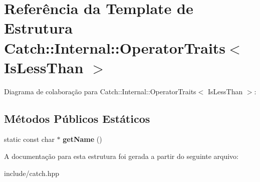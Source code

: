 \hypertarget{structCatch_1_1Internal_1_1OperatorTraits_3_01IsLessThan_01_4}{}\section{Referência da Template de Estrutura Catch\+:\+:Internal\+:\+:Operator\+Traits$<$ Is\+Less\+Than $>$}
\label{structCatch_1_1Internal_1_1OperatorTraits_3_01IsLessThan_01_4}


Diagrama de colaboração para Catch\+:\+:Internal\+:\+:Operator\+Traits$<$ Is\+Less\+Than $>$\+:
\subsection*{Métodos Públicos Estáticos}
\begin{DoxyCompactItemize}
\item 
static const char $\ast$ {\bfseries get\+Name} ()\hypertarget{structCatch_1_1Internal_1_1OperatorTraits_3_01IsLessThan_01_4_aa3b536ddbd2e34b1253931ff00c32712}{}\label{structCatch_1_1Internal_1_1OperatorTraits_3_01IsLessThan_01_4_aa3b536ddbd2e34b1253931ff00c32712}

\end{DoxyCompactItemize}


A documentação para esta estrutura foi gerada a partir do seguinte arquivo\+:\begin{DoxyCompactItemize}
\item 
include/catch.\+hpp\end{DoxyCompactItemize}
